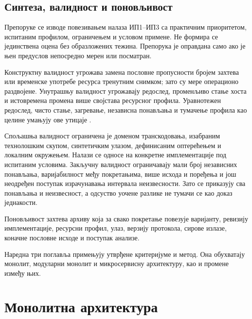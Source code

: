 \documentclass[12pt,oneside]{memoir}
\begin{document}

\section{Синтеза, валидност и поновљивост}

Препоруке се изводе повезивањем налаза ИП1--ИП3 са практичним приоритетом,
испитаним профилом, ограничењем и условом примене. Не формира се јединствена
оцена без образложених тежина. Препорука је оправдана само ако је њен
предуслов непосредно мерен или посматран.

Конструктну валидност угрожава замена пословне пропусности бројем захтева или
временске употребе ресурса тренутним снимком; зато су мере операционо раздвојене.
Унутрашњу валидност угрожавају редослед, променљиво стање хоста и истовремена
промена више својстава ресурсног профила. Уравнотежен редослед, чисто стање,
загревање, независна понављања и тумачење профила као целине умањују ове
утицаје \cite{georges2007statistically}.

Спољашња валидност ограничена је доменом транскодовања, изабраним
технолошким скупом, синтетичким улазом, дефинисаним оптерећењем и локалним
окружењем. Налази се односе на конкретне имплементације под испитаним условима.
Закључну валидност ограничавају мали број независних понављања, варијабилност
међу покретањима, више исхода и поређења и још неодређен поступак израчунавања
интервала неизвесности. Зато се приказују сва понављања и неизвесност, а
одсуство уочене разлике не тумачи се као доказ једнакости.

Поновљивост захтева архиву која за свако покретање повезује варијанту,
ревизију имплементације, ресурсни профил, улаз, верзију протокола, сирове
излазе, коначне пословне исходе и поступак анализе.


Наредна три поглавља примењују утврђене критеријуме и метод. Она обухватају
монолит, модуларни монолит и микро\-сервисну архитектуру, као и промене између
њих.
\endgroup

\chapter{Монолитна архитектура}
\label{chp:monolitna-arhitektura}
\begingroup
\setlength{\emergencystretch}{3em}
\end{document}

